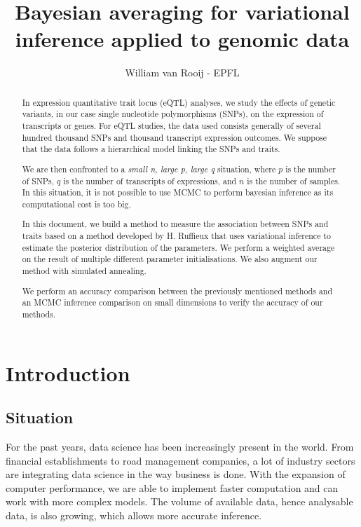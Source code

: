 \documentclass[a4paper, 11pt]{report}
\numberwithin{equation}{chapter}
\begin{document}
\SetEndCharOfAlgoLine{}

\title{Bayesian averaging for variational inference applied to genomic data}
\author{William van Rooij - EPFL}

\maketitle

\newpage
\begin{abstract}
In expression quantitative trait locus (eQTL) analyses, we study the effects of genetic variants, in our case single nucleotide polymorphisms (SNPs), on the expression of transcripts or genes. For eQTL studies, the data used consists generally of several hundred thousand SNPs and thousand transcript expression outcomes. We suppose that the data follows a hierarchical model linking the SNPs and traits.

We are then confronted to a \textit{small n, large p, large q} situation, where $p$ is the number of SNPs, $q$ is the number of transcripts of expressions, and $n$ is the number of samples. In this situation, it is not possible to use MCMC to perform bayesian inference as its computational cost is too big. 

In this document, we build a method to measure the association between SNPs and traits based on a method developed by H. Ruffieux that uses variational inference to estimate the posterior distribution of the parameters. We perform a weighted average on the result of multiple different parameter initialisations. We also augment our method with simulated annealing.

We perform an accuracy comparison between the previously mentioned methods and an MCMC inference comparison on small dimensions to verify the accuracy of our methods.
\end{abstract}
\tableofcontents
\newpage
\chapter{Introduction}
\section{Situation}
For the past years, data science has been increasingly present in the world. From financial establishments to road management companies, a lot of industry sectors are integrating data science in the way business is done. With the expansion of computer performance, we are able to implement faster computation and can work with more complex models. The volume of available data, hence analysable data, is also growing, which allows more accurate inference.
\end{document}
